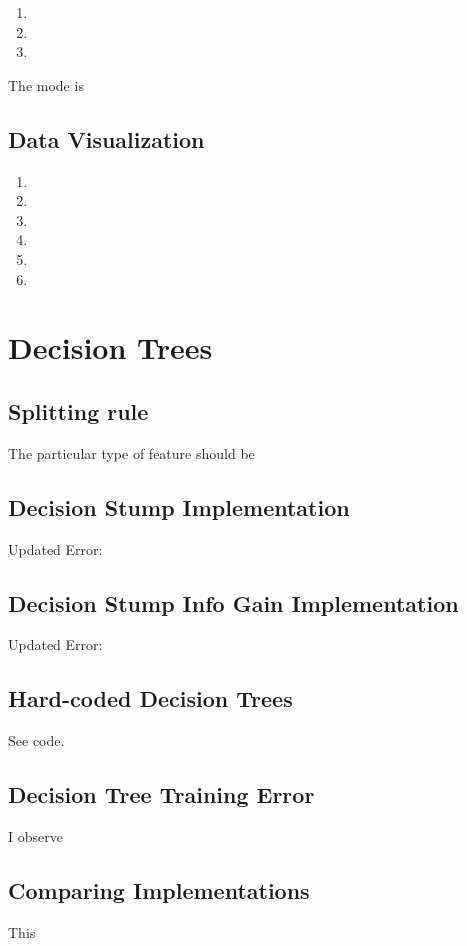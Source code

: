 \documentclass{article}
\begin{document}
\begin{enumerate}
\item
\item
\item
\end{enumerate}

The mode is 

\subsection{Data Visualization}

\begin{enumerate}
\item
\item
\item
\item
\item
\item
\end{enumerate}

\section{Decision Trees}

\subsection{Splitting rule}

The particular type of feature should be 

\subsection{Decision Stump Implementation}

Updated Error: 

\subsection{Decision Stump Info Gain Implementation}

Updated Error: 

\subsection{Hard-coded Decision Trees}

See code.

\subsection{Decision Tree Training Error}

I observe 

\subsection{Comparing Implementations}

This 
\end{document}
